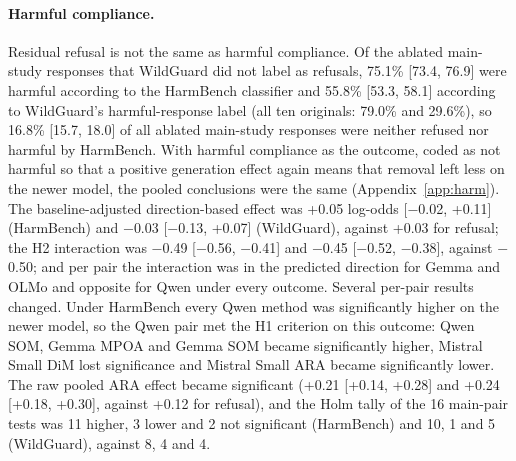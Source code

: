 \paragraph{Harmful compliance.} Residual refusal is not the same as harmful
compliance. Of the ablated main-study responses that WildGuard did not label
as refusals, 75.1\% [73.4, 76.9] were harmful according to the HarmBench
classifier and 55.8\% [53.3, 58.1] according to WildGuard's harmful-response
label (all ten originals: 79.0\% and 29.6\%), so 16.8\% [15.7, 18.0] of all ablated
main-study responses were neither refused nor harmful by HarmBench. With
harmful compliance as the outcome, coded as not harmful so that a positive
generation effect again means that removal left less on the newer model, the
pooled conclusions were the same (Appendix~\ref{app:harm}). The
baseline-adjusted direction-based effect was +0.05 log-odds [$-$0.02, +0.11]
(HarmBench) and $-$0.03 [$-$0.13, +0.07] (WildGuard), against +0.03 for
refusal; the H2 interaction was $-$0.49 [$-$0.56, $-$0.41] and $-$0.45
[$-$0.52, $-$0.38], against $-$0.50; and per pair the interaction was in the
predicted direction for Gemma and OLMo and opposite for Qwen under every
outcome. Several per-pair results changed. Under HarmBench every Qwen method
was significantly higher on the newer model, so the Qwen pair met the H1
criterion on this outcome: Qwen SOM, Gemma MPOA and Gemma SOM became
significantly higher, Mistral Small DiM lost significance and Mistral Small
ARA became significantly lower. The raw pooled ARA effect became significant
(+0.21 [+0.14, +0.28] and +0.24 [+0.18, +0.30], against +0.12 for refusal),
and the Holm tally of the 16 main-pair tests was 11 higher, 3 lower and 2 not
significant (HarmBench) and 10, 1 and 5 (WildGuard), against 8, 4 and 4.

